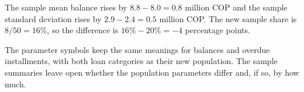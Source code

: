 
    The sample mean balance rises by $8.8-8.0=0.8$ million COP and the sample
    standard deviation rises by $2.9-2.4=0.5$ million COP. The new sample
    share is $8/50=16\%$, so the difference is $16\%-20\%=-4$ percentage points.

    The parameter symbols keep the same meanings for balances and overdue
    installments, with both loan categories as their new population. The sample
    summaries leave open whether the population parameters differ and, if so, by how much.
\fi


